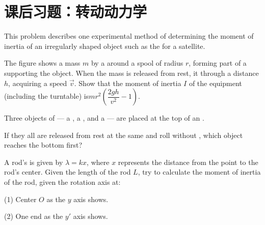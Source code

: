 \newpage
\section{课后习题：转动动力学}
\begin{example}
    This problem describes one experimental method of
    determining the moment of inertia of an irregularly
    shaped object such as the  for a satellite.
    \begin{center}
    \end{center}

    The figure shows a mass $m$  by a  
    around a spool of radius $r$, forming part of a 
    supporting the object. When the mass is released from
    rest, it  through a distance $h$, acquiring a speed
    $\vec{v}$. Show that the moment of inertia $I$ of the equipment
    (including the turntable) is\quad$mr^2(\dfrac{2gh}{v^2}-1)$.
\end{example}
\begin{example}
    Three objects of  --- a , a , and a  --- are placed at the top of
    an .
    \begin{center}
    \end{center}
    If they all are released from rest
    at the same  and roll without , which object reaches the bottom first?
\end{example}
\begin{example}
    A rod's  is given by $\lambda=kx$, where $x$ represents the distance from the point to the rod's center.
    Given the length of the rod $L$, try to calculate the moment of inertia of the rod, given the rotation axis at:

    (1) Center $O$ as the $y$ axis shows.

    (2) One end as the $y'$ axis shows.
\end{example}
